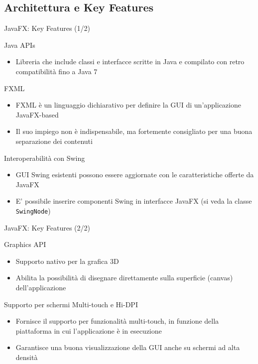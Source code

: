 \documentclass[presentation]{beamer}
\begin{document}
\subsection{Architettura e Key Features}

\begin{frame}{JavaFX: Key Features (1/2)}
\begin{block}{Java APIs}
\begin{itemize}
\item Libreria che include classi e interfacce scritte in Java e compilato con retro compatibilità fino a Java 7
\end{itemize}
\end{block}
%
\begin{block}{FXML}
\begin{itemize}
\item FXML è un linguaggio dichiarativo per definire la GUI di un'applicazione JavaFX-based
\item Il suo impiego non è indispensabile, ma fortemente consigliato per una buona separazione dei contenuti
\end{itemize}
\end{block}
%
\begin{block}{Interoperabilità con Swing}
\begin{itemize}
\item GUI Swing esistenti possono essere aggiornate con le caratteristiche offerte da JavaFX
\item E' possibile inserire componenti Swing in interfacce JavaFX (si veda la classe \texttt{SwingNode})
\end{itemize}
\end{block}
\end{frame}

\begin{frame}{JavaFX: Key Features (2/2)}
\begin{block}{Graphics API}
\begin{itemize}
\item Supporto nativo per la grafica 3D
\item Abilita la possibilità di disegnare direttamente sulla superficie (canvas) dell'applicazione
\end{itemize}
\end{block}
%
\begin{block}{Supporto per schermi Multi-touch e Hi-DPI}
\begin{itemize}
\item Fornisce il supporto per funzionalità  multi-touch, in funzione della piattaforma in cui l'applicazione è in esecuzione
\item Garantisce una buona visualizzazione della GUI anche su schermi ad alta densità
\end{itemize}
\end{block}
\end{frame}
\end{document}
